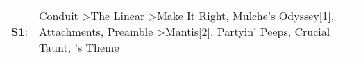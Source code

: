 \begin{supertabular}{p{0.03\textwidth}p{0.92\textwidth}}
 \textbf{S1}:  &  Conduit\textsuperscript{} \textgreater \enspace The Linear\textsuperscript{} \textgreater \enspace Make It Right\textsuperscript{}, \enspace Mulche's Odyssey[1]\textsuperscript{}, \enspace Attachments\textsuperscript{}, \enspace Preamble\textsuperscript{} \textgreater \enspace Mantis[2]\textsuperscript{}, \enspace Partyin' Peeps\textsuperscript{}, \enspace Crucial Taunt\textsuperscript{}, 's Theme\textsuperscript{}  \enspace  \\
\end{supertabular}
